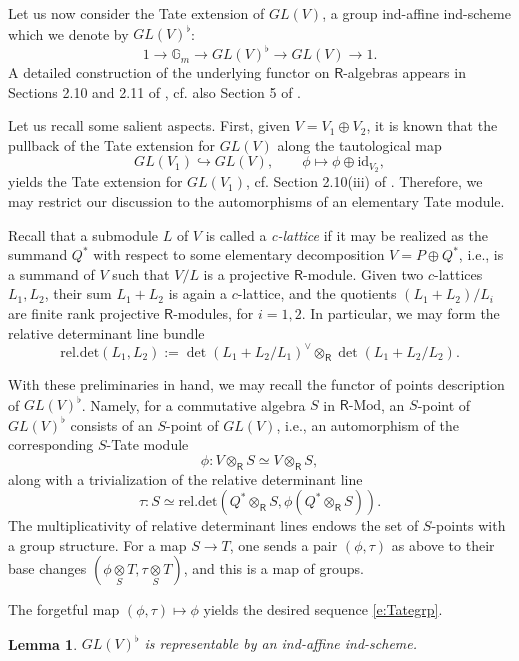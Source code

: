 \documentclass{amsart}
\newtheorem{Lem}[Thm]{Lemma}
\theoremstyle{definition}
\newcommand{\sss}{\subsubsection{}}
\renewcommand{\mod}{\text{-}\on{Mod}}
\newcommand{\on}{\mathrm}
\newcommand{\Ring}{\mathsf{R}}
\numberwithin{equation}{section}
\begin{document}
\sss \label{sss:Tateformula}Let us now consider the Tate extension of $GL(V)$, a group ind-affine ind-scheme  which we denote by $GL(V)^\flat$: 
\begin{equation} 1 \rightarrow \mathbb{G}_m \rightarrow GL(V)^\flat \rightarrow GL(V) \rightarrow 1. \label{e:Tategrp}\end{equation}
A detailed construction of the underlying functor on $\Ring$-algebras appears in Sections 2.10 and 2.11 of \cite{BBE}, cf. also Section 5 of \cite{DrInf}. 


Let us recall some salient aspects. First, given $V = V_1 \oplus V_2$, it is known that the pullback of the Tate extension for $GL(V)$ along the tautological map  
$$GL(V_1) \hookrightarrow GL(V), \quad \quad \phi \mapsto \phi \oplus \on{id}_{V_2},$$
yields the Tate extension for $GL(V_1)$, cf. Section 2.10(iii) of \cite{BBE}. Therefore, we may restrict our discussion to the automorphisms of an elementary Tate module. 

Recall that a submodule $L$ of $V$ is called a {\em c-lattice} if it may be realized as the summand $Q^*$ with respect to some elementary decomposition $V = P \oplus Q^*$, i.e., is a summand of $V$ such that $V/L$ is a projective $\Ring$-module. Given two $c$-lattices $L_1, L_2$, their sum $L_1 + L_2$ is again a $c$-lattice, and the quotients $(L_1 + L_2)/L_i$ are finite rank projective $\Ring$-modules, for $i = 1,2$. In particular,  we may form the relative determinant line bundle$$\on{rel.det}(L_1, L_2) := \det(L_1 + L_2/L_1)^\vee \otimes_{\Ring} \det(L_1 + L_2 / L_2).$$ 

With these preliminaries in hand, we may recall the functor of points description of $GL(V)^\flat$. Namely, for a commutative algebra $S$ in $\Ring\mod$, an $S$-point of $GL(V)^\flat$ consists of an $S$-point of $GL(V)$, i.e., an automorphism of the corresponding $S$-Tate module $$\phi: V \otimes_{\Ring} S \simeq V \otimes_{\Ring} S,$$along with a trivialization of the relative determinant line $$\tau: S \simeq \on{rel.det}( Q^* \otimes_{\Ring} S, \phi(Q^* \otimes_{\Ring} S)).$$The multiplicativity of relative determinant lines endows the set of $S$-points with a group structure. For a map $S \rightarrow T$, one sends a pair $(\phi, \tau)$ as above to their base changes $(\phi \underset{S} \otimes T, \tau \underset{S} \otimes T)$, and this is a map of groups.  

The forgetful map $(\phi, \tau) \mapsto \phi$ yields the desired sequence \eqref{e:Tategrp}. 

\begin{Lem}\label{l:homtateext} $GL(V)^\flat$ is representable by an ind-affine ind-scheme.     
\end{Lem}
\end{document}
